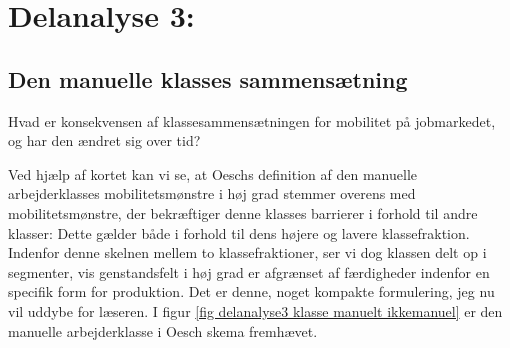 






\chapter{Delanalyse 3:  \label{kapitel_delanalyse3_klasser}}




   
   



\section{Den manuelle klasses sammensætning}





\begin{tcolorbox}[title=Forskningspørgsmål 2,
subtitle style={boxrule=0.4pt}, colbacktitle=darkorange!99!white,colback=trolleygrey!30!white,coltitle=black]
  Hvad er konsekvensen af klassesammensætningen for mobilitet på jobmarkedet, og har den ændret sig over tid?
\end{tcolorbox}
 
Ved hjælp af kortet kan vi se, at Oeschs definition af den manuelle arbejderklasses mobilitetsmønstre i høj grad stemmer overens med mobilitetsmønstre, der bekræftiger denne klasses barrierer i forhold til andre klasser: Dette gælder både i forhold til dens højere og lavere klassefraktion. Indenfor denne skelnen mellem to klassefraktioner, ser vi dog klassen delt op i segmenter, vis genstandsfelt i høj grad er afgrænset af færdigheder indenfor en specifik form for produktion. Det er denne, noget kompakte formulering, jeg nu vil uddybe for læseren. I figur \ref{fig delanalyse3 klasse manuelt ikkemanuel} er den manuelle arbejderklasse i Oesch skema fremhævet. 


